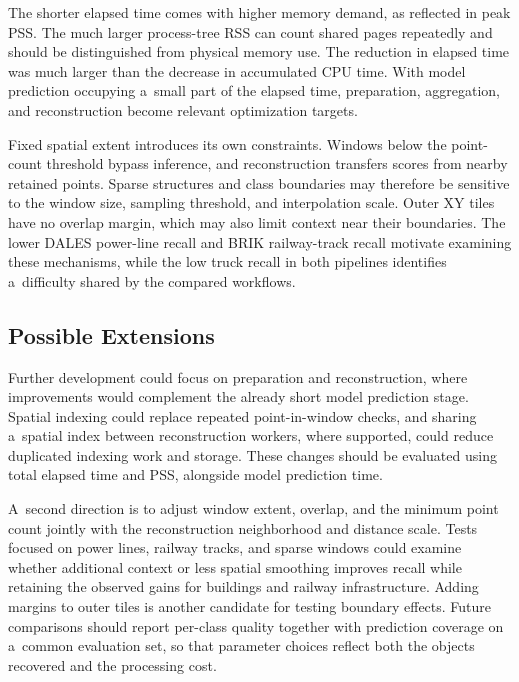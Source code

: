 The shorter elapsed time comes with higher memory demand, as reflected in peak PSS. The much larger process-tree RSS can count shared pages repeatedly and should be distinguished from physical memory use. The reduction in elapsed time was much larger than the decrease in accumulated CPU time. With model prediction occupying a~small part of the elapsed time, preparation, aggregation, and reconstruction become relevant optimization targets.

Fixed spatial extent introduces its own constraints. Windows below the point-count threshold bypass inference, and reconstruction transfers scores from nearby retained points. Sparse structures and class boundaries may therefore be sensitive to the window size, sampling threshold, and interpolation scale. Outer XY tiles have no overlap margin, which may also limit context near their boundaries. The lower DALES power-line recall and BRIK railway-track recall motivate examining these mechanisms, while the low truck recall in both pipelines identifies a~difficulty shared by the compared workflows.

\subsection{Possible Extensions}

Further development could focus on preparation and reconstruction, where improvements would complement the already short model prediction stage. Spatial indexing could replace repeated point-in-window checks, and sharing a~spatial index between reconstruction workers, where supported, could reduce duplicated indexing work and storage. These changes should be evaluated using total elapsed time and PSS, alongside model prediction time.

A~second direction is to adjust window extent, overlap, and the minimum point count jointly with the reconstruction neighborhood and distance scale. Tests focused on power lines, railway tracks, and sparse windows could examine whether additional context or less spatial smoothing improves recall while retaining the observed gains for buildings and railway infrastructure. Adding margins to outer tiles is another candidate for testing boundary effects. Future comparisons should report per-class quality together with prediction coverage on a~common evaluation set, so that parameter choices reflect both the objects recovered and the processing cost.